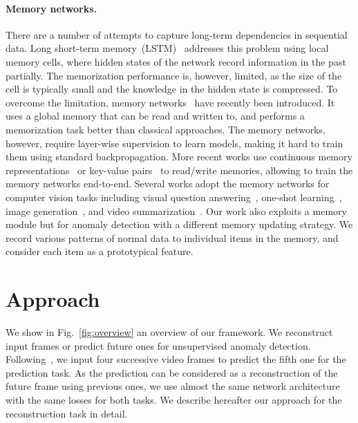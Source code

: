 \documentclass[10pt,twocolumn,letterpaper]{article}
\begin{document}
\vspace{-0.5cm}
	\paragraph{Memory networks.}
	There are a number of attempts to capture long-term dependencies in sequential data. Long short-term memory~(LSTM)~\cite{hochreiter1997long} addresses this problem using local memory cells, where hidden states of the network record information in the past partially. The memorization performance is, however, limited, as the size of the cell is typically small and the knowledge in the hidden state is compressed. To overcome the limitation, memory networks~\cite{weston2015memory} have recently been introduced. It uses a global memory that can be read and written to, and performs a memorization task better than classical approaches. The memory networks, however, require layer-wise supervision to learn models, making it hard to train them using standard backpropagation. More recent works use continuous memory representations~\cite{sukhbaatar2015end} or key-value pairs~\cite{miller2016key} to read/write memories, allowing to train the memory networks end-to-end. Several works adopt the memory networks for computer vision tasks including visual question answering~\cite{kumar2016ask,fan2019heterogeneous}, one-shot learning~\cite{santoro2016meta,kaiser2017learning,cai2018memory}, image generation~\cite{zhu2019dm}, and video summarization~\cite{lee2018memory}. Our work also exploits a memory module but for anomaly detection with a different memory updating strategy. We record various patterns of normal data to individual items in the memory, and consider each item as a prototypical feature.
	



    
\vspace{-0.2cm}    
\section{Approach}
\vspace{-0.1cm}


	
We show in Fig.~\ref{fig:overview} an overview of our framework. We reconstruct input frames or predict future ones for unsupervised anomaly detection. Following~\cite{liu2018future}, we input four successive video frames to predict the fifth one for the prediction task. As the prediction can be considered as a reconstruction of the future frame using previous ones, we use almost the same network architecture with the same losses for both tasks. We describe hereafter our approach for the reconstruction task in detail. 
\end{document}
